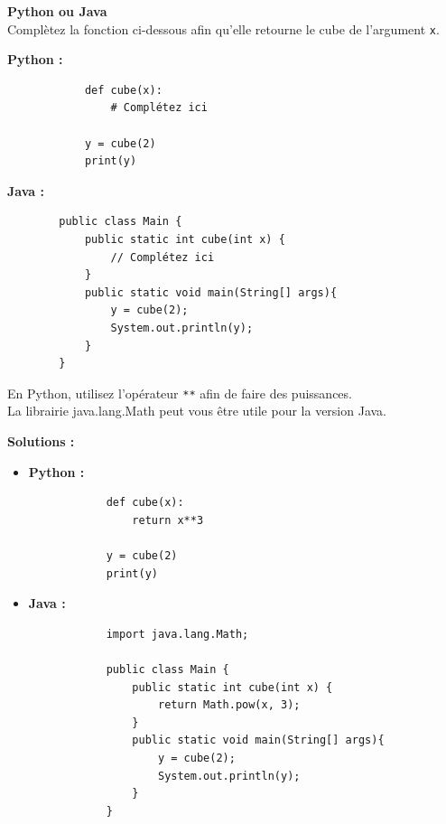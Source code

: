 \begin{Exercice}[5 minutes] \textbf{Python ou Java} \\
    Complètez la fonction ci-dessous afin qu'elle retourne le cube de l'argument \lstinline{x}.
    
    \textbf{Python :}
        \begin{verbatim}
            def cube(x):
                # Complétez ici
                
            y = cube(2)
            print(y)
        \end{verbatim}
        
    \textbf{Java :}
    \begin{verbatim}
        public class Main {
            public static int cube(int x) {
                // Complétez ici
            }
            public static void main(String[] args){
                y = cube(2);
                System.out.println(y);
            }
        }
    \end{verbatim}
    
    
    
    \begin{conseil}
        En Python, utilisez l'opérateur \lstinline{**} afin de faire des puissances. \\ 
        La librairie java.lang.Math peut vous être utile pour la version Java.
    \end{conseil}
    \textbf{Solutions :}
    \begin{itemize}
        \item \textbf{Python :}
        \begin{verbatim}
            def cube(x):
                return x**3
                
            y = cube(2)
            print(y)
        \end{verbatim}
        
        \item \textbf{Java :}
        \begin{verbatim}
            import java.lang.Math;
            
            public class Main {
                public static int cube(int x) {
                    return Math.pow(x, 3);
                }
                public static void main(String[] args){
                    y = cube(2);
                    System.out.println(y);
                }
            }
        \end{verbatim}
    \end{itemize}

\end{Exercice}

